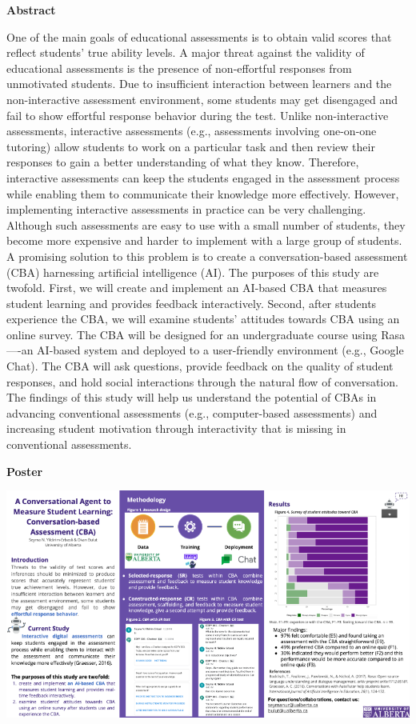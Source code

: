 \documentclass[
]{book}
\begin{document}
\textbf{Abstract}

One of the main goals of educational assessments is to obtain valid scores that reflect students' true ability levels. A major threat against the validity of educational assessments is the presence of non-effortful responses from unmotivated students. Due to insufficient interaction between learners and the non-interactive assessment environment, some students may get disengaged and fail to show effortful response behavior during the test. Unlike non-interactive assessments, interactive assessments (e.g., assessments involving one-on-one tutoring) allow students to work on a particular task and then review their responses to gain a better understanding of what they know. Therefore, interactive assessments can keep the students engaged in the assessment process while enabling them to communicate their knowledge more effectively. However, implementing interactive assessments in practice can be very challenging. Although such assessments are easy to use with a small number of students, they become more expensive and harder to implement with a large group of students. A promising solution to this problem is to create a conversation-based assessment (CBA) harnessing artificial intelligence (AI). The purposes of this study are twofold. First, we will create and implement an AI-based CBA that measures student learning and provides feedback interactively. Second, after students experience the CBA, we will examine students' attitudes towards CBA using an online survey. The CBA will be designed for an undergraduate course using Rasa----an AI-based system and deployed to a user-friendly environment (e.g., Google Chat). The CBA will ask questions, provide feedback on the quality of student responses, and hold social interactions through the natural flow of conversation. The findings of this study will help us understand the potential of CBAs in advancing conventional assessments (e.g., computer-based assessments) and increasing student motivation through interactivity that is missing in conventional assessments.

\textbf{Poster}

\includegraphics{Content/SO2.png}
\end{document}
